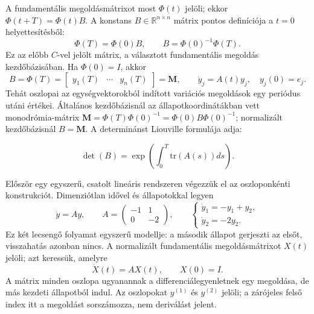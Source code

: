 A fundamentális megoldásmátrixot most $\Phi(t)$ jelöli; ekkor $\Phi(t+T)=\Phi(t)B$. A konstans $B\in\mathbb R^{n\times n}$ mátrix pontos definíciója a $t=0$ helyettesítésből:
\[
\Phi(T)=\Phi(0)B,\qquad
\boxed{B=\Phi(0)^{-1}\Phi(T)}.
\]
Ez az előbb $C$-vel jelölt mátrix, a választott fundamentális megoldás kezdőbázisában. Ha $\Phi(0)=I$, akkor
\[
B=\Phi(T)=\begin{bmatrix}y_1(T)&\cdots&y_n(T)\end{bmatrix}=\mathbf M,
\qquad \dot y_j=A(t)y_j,\quad y_j(0)=e_j.
\]
Tehát oszlopai az egységvektorokból indított variációs megoldások egy periódus utáni értékei. Általános kezdőbázisnál az állapotkoordinátákban vett monodrómia-mátrix $\mathbf M=\Phi(T)\Phi(0)^{-1}=\Phi(0)B\Phi(0)^{-1}$; normalizált kezdőbázisnál $B=\mathbf M$. A determinánst Liouville formulája adja:


\begin{equation}
\det(B)=\exp \left( \int_0^T \mathrm{tr}(A(s)) ds\right).
\end{equation}

Először egy egyszerű, csatolt lineáris rendszeren végezzük el az oszloponkénti konstrukciót. Dimenziótlan idővel és állapotokkal legyen
\begin{equation}\label{eq:fundamental_example_system}
 \dot y=Ay,\qquad
 A=\begin{pmatrix}-1&1\\0&-2\end{pmatrix},\qquad
 \begin{cases}\dot y_1=-y_1+y_2,\\\dot y_2=-2y_2.\end{cases}
\end{equation}
Ez két lecsengő folyamat egyszerű modellje: a második állapot gerjeszti az elsőt, visszahatás azonban nincs. A normalizált fundamentális megoldásmátrixot $X(t)$ jelöli; azt keressük, amelyre
\begin{equation}\label{eq:fundamental_example_ivp}
 \dot X(t)=AX(t),\qquad X(0)=I.
\end{equation}
A mátrix minden oszlopa ugyanannak a differenciálegyenletnek egy megoldása, de más kezdeti állapotból indul. Az oszlopokat $y^{(1)}$ és $y^{(2)}$ jelöli; a zárójeles felső index itt a megoldást sorszámozza, nem deriválást jelent.

